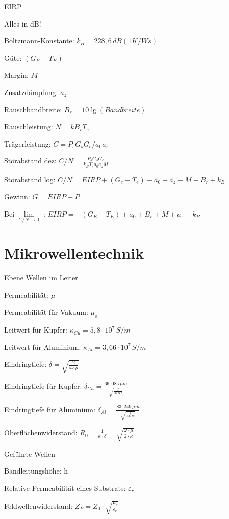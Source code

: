 \documentclass[german]{latex4ei/latex4ei_sheet}
\begin{document}
    \begin{sectionbox}{EIRP}
        \item Alles in dB!
        \item Boltzmann-Konstante: $k_B = 228,6\,dB(1K/Ws)$
        \item Güte: $(G_E-T_E)$ 
        \item Margin: $M$
        \item Zusatzdämpfung: $a_z$
        \item Rauschbandbreite: $B_r = 10 \lg(Bandbreite)$
        \item Rauschleistung: $N = kB_rT_e$
        \item Trägerleistung: $C = P_s G_s G_e/a_0 a_z$
        \item Störabstand dez: $C/N = \frac{P_s G_s G_e}{k_B T_e a_0 a_z M}$
        \item Störabstand log: $C/N = EIRP + (G_e-T_e)-a_0-a_z-M-B_r+k_B$
        \item Gewinn: $G = EIRP - P$
        \item Bei $\lim\limits_{C/N\rightarrow 0}$ : $EIRP = -(G_E-T_E) + a_0 + B_r + M + a_z - k_B$    
    \end{sectionbox}
\section{Mikrowellentechnik}
    \begin{sectionbox}{Ebene Wellen im Leiter}
        \item Permeabilität: $\mu$
        \item Permeabilität für Vakuum: $\mu_o$
        \item Leitwert für Kupfer: $\kappa_{Cu} = 5,8 \cdot 10^7\, S/m$
        \item Leitwert für Aluminium: $\kappa_{Al} = 3,66 \cdot 10^7\, S/m$
        \item Eindringtiefe: $\delta = \sqrt{\frac{2}{\omega \kappa \mu}}$
        \item Eindringtiefe für Kupfer: $\delta_{Cu} = \frac{66,085\,\mu m}{\sqrt{\frac{f}{MHz}}}$
        \item Eindringtiefe für Aluminium: $\delta_{Al} = \frac{83,249\,\mu m}{\sqrt{\frac{f}{MHz}}}$
        \item Oberflächenwiderstand: $R_0 = \frac{1}{\kappa \cdot \delta} = \sqrt{\frac{\omega\cdot \mu}{2\cdot \kappa}}$
    \end{sectionbox}
    \begin{sectionbox}{Geführte Wellen}
        \item Bandleitungshöhe: h
        \item Relative Permeabilität eines Substrats: $\varepsilon_r$
        \item Feldwellenwiderstand: $Z_F = Z_0 \cdot \sqrt{\frac{\mu_r}{\epsilon_r}}$
    \end{sectionbox}
\end{document}
